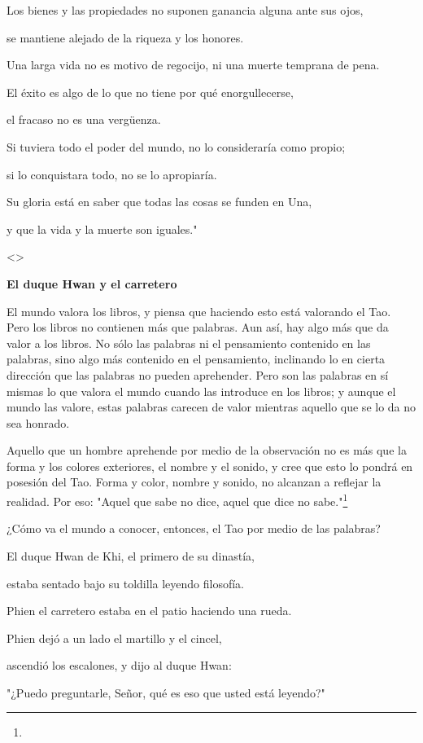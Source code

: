Los bienes y las propiedades no suponen ganancia alguna ante sus ojos,

se mantiene alejado de la riqueza y los honores.

Una larga vida no es motivo de regocijo, ni una muerte temprana de pena.

El éxito es algo de lo que no tiene por qué enorgullecerse,

el fracaso no es una vergüenza.

Si tuviera todo el poder del mundo, no lo consideraría como propio;

si lo conquistara todo, no se lo apropiaría.

Su gloria está en saber que todas las cosas se funden en Una,

y que la vida y la muerte son iguales."

\textless\textgreater{}

\textbf{{El duque Hwan y el carretero}}

El mundo valora los libros, y piensa que haciendo esto está valorando el
Tao. Pero los libros no contienen más que palabras. Aun así, hay algo
más que da valor a los libros. No sólo las palabras ni el pensamiento
contenido en las palabras, sino algo más contenido en el pensamiento,
inclinando lo en cierta dirección que las palabras no pueden aprehender.
Pero son las palabras en sí mismas lo que valora el mundo cuando las
introduce en los libros; y aunque el mundo las valore, estas palabras
carecen de valor mientras aquello que se lo da no sea honrado.

Aquello que un hombre aprehende por medio de la observación no es más
que la forma y los colores exteriores, el nombre y el sonido, y cree que
esto lo pondrá en posesión del Tao. Forma y color, nombre y sonido, no
alcanzan a reflejar la realidad. Por eso: "Aquel que sabe no dice, aquel
que dice no sabe."\footnote{}

¿Cómo va el mundo a conocer, entonces, el Tao por medio de las palabras?

El duque Hwan de Khi, el primero de su dinastía,

estaba sentado bajo su toldilla leyendo filosofía.

Phien el carretero estaba en el patio haciendo una rueda.

Phien dejó a un lado el martillo y el cincel,

ascendió los escalones, y dijo al duque Hwan:

"¿Puedo preguntarle, Señor, qué es eso que usted está leyendo?"

